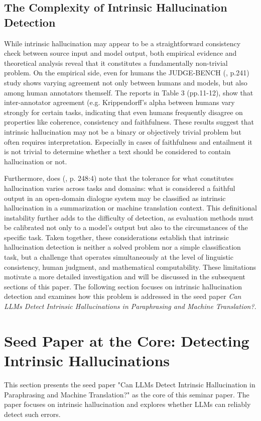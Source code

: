 \documentclass[
  seminar,   	 
  english,   	 
  titlepage=on,
  captions=tableheadings
]{ttlab-qualify}
\begin{document}
\subsection{The Complexity of Intrinsic Hallucination Detection}
While intrinsic hallucination may appear to be a straightforward consistency check between source input and model output, both empirical evidence and theoretical analysis reveal that it constitutes a fundamentally non-trivial problem.
On the empirical side, even for humans the JUDGE-BENCH (\cite{Bavaresco2025JudgeBench}, p.241) study shows varying agreement not only between humans and models, but also among human annotators themself. The reports in Table 3 (pp.11-12), show that inter-annotator agreement (e.g. Krippendorff's alpha between humans vary strongly for certain tasks, indicating that even humans frequently disagree on properties like coherence, consistency and faithfulness. These results suggest that intrinsic hallucination may not be a binary or objectively trivial problem but often requires interpretation. Especially in cases of faithfulness and entailment it is not trivial to determine whether a text should be considered to contain hallucination or not.

 Furthermore, does (\cite{Ji2023HallucinationSurvey}, p. 248:4) note that the tolerance for what constitutes hallucination varies across tasks and domains: what is considered a faithful output in an open-domain dialogue system may be classified as intrinsic hallucination in a summarization or machine translation context. This definitional instability further adds to the difficulty of detection, as evaluation methods must be calibrated not only to a model's output but also to the circumstances of the specific task. Taken together, these considerations establish that intrinsic hallucination detection is neither a solved problem nor a simple classification task, but a challenge that operates simultaneously at the level of linguistic consistency, human judgment, and mathematical computability. These limitations motivate a more detailed investigation and will be discussed in the subsequent sections of this paper. The following section focuses on intrinsic hallucination detection and examines how this problem is addressed in the seed paper \textit{Can LLMs Detect Intrinsic Hallucinations in Paraphrasing and Machine Translation?}.

\section{Seed Paper at the Core: Detecting Intrinsic Hallucinations}
This section presents the seed paper "Can LLMs Detect Intrinsic Hallucination in Paraphrasing and Machine Translation?" as the core of this seminar paper. The paper focuses on intrinsic hallucination and explores whether LLMs can reliably detect such errors.
\newline
\end{document}
